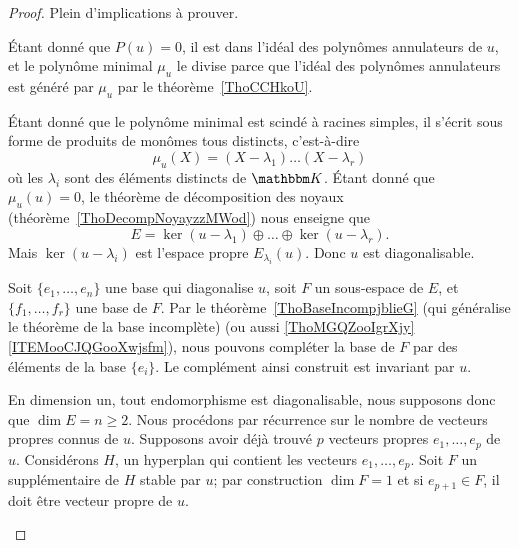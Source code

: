 \begin{proof}
    Plein d'implications à prouver.
    \begin{subproof}
    \item[\ref{ItemThoDigLEQEXRi} implique~\ref{ItemThoDigLEQEXRii}] Étant donné que \( P(u)=0\), il est dans l'idéal des polynômes annulateurs de \( u\), et le polynôme minimal \( \mu_u\) le divise parce que l'idéal des polynômes annulateurs est généré par \( \mu_u\) par le théorème~\ref{ThoCCHkoU}.

    \item[\ref{ItemThoDigLEQEXRii} implique~\ref{ItemThoDigLEQEXRiv}] Étant donné que le polynôme minimal est scindé à racines simples, il s'écrit sous forme de produits de monômes tous distincts, c'est-à-dire
    \begin{equation}
        \mu_u(X)=(X-\lambda_1)\ldots(X-\lambda_r)
    \end{equation}
    où les \( \lambda_i\) sont des éléments distincts de \( \eK\). Étant donné que \( \mu_u(u)=0\), le théorème de décomposition des noyaux (théorème~\ref{ThoDecompNoyayzzMWod}) nous enseigne que
    \begin{equation}
        E=\ker(u-\lambda_1)\oplus\ldots\oplus\ker(u-\lambda_r).
    \end{equation}
    Mais \( \ker(u-\lambda_i)\) est l'espace propre \( E_{\lambda_i}(u)\). Donc \( u\) est diagonalisable.

\item[\ref{ItemThoDigLEQEXRiv} implique~\ref{ItemThoDigLEQEXRiii}] Soit \( \{ e_1,\ldots, e_n \}\) une base qui diagonalise \( u\), soit \( F\) un sous-espace de \( E\), et \( \{ f_1,\ldots, f_r \}\) une base de \( F\). Par le théorème~\ref{ThoBaseIncompjblieG} (qui généralise le théorème de la base incomplète) (ou aussi \ref{ThoMGQZooIgrXjy}\ref{ITEMooCJQGooXwjsfm}), nous pouvons compléter la base de \( F\) par des éléments de la base \( \{ e_i \}\). Le complément ainsi construit est invariant par \( u\).

\item[\ref{ItemThoDigLEQEXRiii} implique~\ref{ItemThoDigLEQEXRiv}] En dimension un, tout endomorphisme est diagonalisable, nous supposons donc que \( \dim E=n\geq 2\). Nous procédons par récurrence sur le nombre de vecteurs propres connus de \( u\). Supposons avoir déjà trouvé \( p\) vecteurs propres \( e_1,\ldots, e_p\) de \( u\). Considérons \( H\), un hyperplan qui contient les vecteurs \( e_1,\ldots, e_p\). Soit \( F\) un supplémentaire de \( H\) stable par \( u\); par construction \( \dim F=1\) et si \( e_{p+1}\in F\), il doit être vecteur propre de \( u\).


\end{subproof}
\end{proof}
